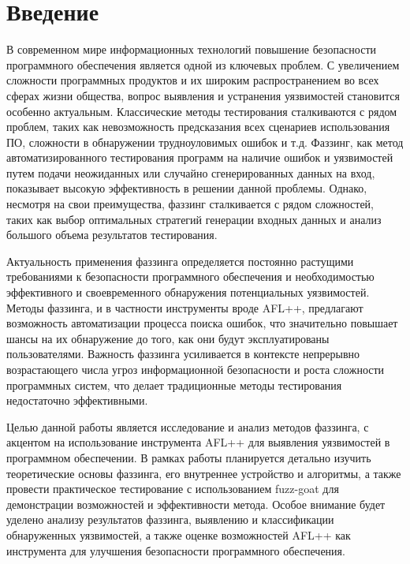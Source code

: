 \chapter*{Введение} %

В современном мире информационных технологий повышение безопасности программного обеспечения является одной из ключевых проблем. С увеличением сложности программных продуктов и их широким распространением во всех сферах жизни общества, вопрос выявления и устранения уязвимостей становится особенно актуальным. Классические методы тестирования сталкиваются с рядом проблем, таких как невозможность предсказания всех сценариев использования ПО, сложности в обнаружении трудноуловимых ошибок и т.д. Фаззинг, как метод автоматизированного тестирования программ на наличие ошибок и уязвимостей путем подачи неожиданных или случайно сгенерированных данных на вход, показывает высокую эффективность в решении данной проблемы. Однако, несмотря на свои преимущества, фаззинг сталкивается с рядом сложностей, таких как выбор оптимальных стратегий генерации входных данных и анализ большого объема результатов тестирования.
\par
Актуальность применения фаззинга определяется постоянно растущими требованиями к безопасности программного обеспечения и необходимостью эффективного и своевременного обнаружения потенциальных уязвимостей. Методы фаззинга, и в частности инструменты вроде AFL++, предлагают возможность автоматизации процесса поиска ошибок, что значительно повышает шансы на их обнаружение до того, как они будут эксплуатированы пользователями. Важность фаззинга усиливается в контексте непрерывно возрастающего числа угроз информационной безопасности и роста сложности программных систем, что делает традиционные методы тестирования недостаточно эффективными.
\par
Целью данной работы является исследование и анализ методов фаззинга, с акцентом на использование инструмента AFL++ для выявления уязвимостей в программном обеспечении. В рамках работы планируется детально изучить теоретические основы фаззинга, его внутреннее устройство и алгоритмы, а также провести практическое тестирование с использованием fuzz-goat для демонстрации возможностей и эффективности метода. Особое внимание будет уделено анализу результатов фаззинга, выявлению и классификации обнаруженных уязвимостей, а также оценке возможностей AFL++ как инструмента для улучшения безопасности программного обеспечения.
\par
